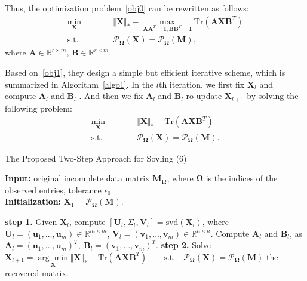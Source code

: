 \documentclass{article}
\begin{document}
{\begin{equation}
\end{equation}
Thus, the optimization problem~\eqref{obj0} can be rewritten as follows:
\begin{equation}
\begin{aligned}
    \min_{\mathbf X}\qquad&\quad  \Vert\mathbf X \Vert_* - \underset{\mathbf A\mathbf A^T=\mathbf I,\mathbf B\mathbf B^T=\mathbf I}{\max} \text{Tr}(\mathbf A\mathbf X\mathbf B^T) \\
    \text{s.t.}\qquad&\quad  \mathcal{P}_{\mathbf\Omega}(\mathbf X) =  \mathcal{P}_{\mathbf\Omega}(\mathbf M),
\end{aligned}\label{obj1}
\end{equation}
where $\mathbf A \in \mathbb{R}^{r \times m}$, $\mathbf B \in \mathbb{R}^{r \times m}$.

Based on~\eqref{obj1},  they design a simple but efficient iterative scheme, which is summarized in Algorithm~\ref{algo1}. In the $l$th iteration, we first fix $\mathbf X_l$ and compute $\mathbf A_l$ and $\mathbf B_l$ . And then we fix $\mathbf A_l$ and $\mathbf B_l$ ro update $\mathbf X_{l+1}$ by  solving the following problem:
\begin{equation}
\begin{aligned}
    \underset{\mathbf X}{\min}\qquad&\quad \Vert\mathbf X \Vert_* - \text{Tr}(\mathbf A\mathbf X\mathbf B^T) \\
    \text{s.t.}\qquad&\quad   \mathcal{P}_{\mathbf\Omega}(\mathbf X) =  \mathcal{P}_{\mathbf\Omega}(\mathbf M).
\end{aligned}\label{obj2}
\end{equation}

\begin{algorithm}[t]
    \caption{The Proposed Two-Step Approach for Sovling (6)}
    \label{algo1}
    \textbf{Input:} original incomplete data matrix $\mathbf M_{\mathbf\Omega}$, where $\mathbf \Omega$ is the indices of the observed entries, tolerance $\epsilon_0$ \\
    \textbf{Initialization:} $\mathbf X_1 = \mathcal{P}_{\mathbf\Omega}(\mathbf M)$. 
    \begin{algorithmic}
        \Repeat 
        \State \textbf{step 1.} Given $\mathbf X_l$, compute $[\mathbf U_l, \mathbf \varSigma_l, \mathbf V_l] = \text{svd}(\mathbf X_l)$, 
        \State where $\mathbf U_l = (\mathbf u_1,\dots,\mathbf u_m) \in \mathbb{R}^{m \times m}$, $\mathbf V_l = (\mathbf v_1,\dots,\mathbf v_m) \in \mathbb{R}^{n \times n}$. 
        \State Compute $\mathbf A_l$ and $\mathbf B_l$, as $\mathbf A_l = (\mathbf u_1,\dots,\mathbf u_m)^T, \ \mathbf B_l = (\mathbf v_1,\dots,\mathbf v_m)^T$.
        \State \textbf{step 2.} Solve $\mathbf X_{l+1} = \underset{\mathbf X}{\arg\min} \Vert\mathbf X \Vert_* - \text{Tr}(\mathbf A\mathbf X\mathbf B^T) \qquad \text{s.t.} \quad \mathcal{P}_{\mathbf\Omega}(\mathbf X) =  \mathcal{P}_{\mathbf\Omega}(\mathbf M)$ 
        \State \Return the recovered matrix.
    \end{algorithmic}
\end{algorithm}



}
\end{document}
